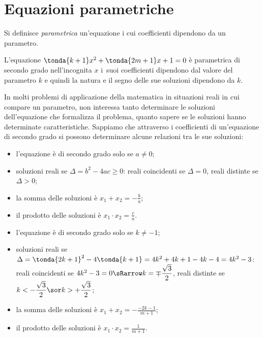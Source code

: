 \section{Equazioni parametriche}
\label{sec:eq2gr_parametriche}

\begin{definizione}
Si definisce \emph{parametrica} un'equazione i cui coefficienti dipendono da un 
parametro.
\end{definizione}
L'equazione \(\tonda{k +1}x^{2} + \tonda{2m +1}x + 1 = 0\) è 
parametrica di secondo 
grado nell'incognita \(x\) i~suoi coefficienti dipendono dal valore del parametro 
\(k\) e quindi la natura e il segno delle sue soluzioni dipendono da \(k\).

In molti problemi di applicazione della matematica in situazioni reali in cui 
compare un parametro, non interessa tanto determinare le soluzioni 
dell'equazione che formalizza il problema, quanto sapere se le soluzioni hanno 
determinate caratteristiche.
Sappiamo che attraverso i coefficienti di un'equazione di secondo grado si 
possono determinare alcune relazioni tra le sue soluzioni:
\begin{itemize} [noitemsep]
\item l'equazione è di secondo grado solo se \(a \neq 0\);
\item soluzioni reali se \(\Delta = b^{2} - 4 a c \geq 0\):
 \subitem reali coincidenti se \(\Delta = 0\), 
 \subitem reali distinte se \(\Delta > 0\);
\item la somma delle soluzioni è \(x_{1} + x_{2} = - \frac{b}{a}\);
\item il prodotto delle soluzioni è \(x_{1} \cdot x_{2} = \frac{c}{a}\).
\end{itemize}

\begin{itemize} [noitemsep]
\item l'equazione è di secondo grado solo se \(k \neq -1\);
\item soluzioni reali se 
\(\Delta = \tonda{2k +1}^{2} - 4 \tonda{k +1}= 4k^2 +4k +1-4k-4= 4k^2-3\):
 \subitem reali coincidenti se 
 \(4k^2-3 = 0 \sRarrow k = \mp \dfrac{\sqrt{3}}{2}\), 
 \subitem reali distinte se 
 \(k < -\dfrac{\sqrt{3}}{2} \sor k > +\dfrac{\sqrt{3}}{2}\);
\item la somma delle soluzioni è 
\(x_{1} + x_{2} = - \frac{-2k -1}{m+1}\);
\item il prodotto delle soluzioni è 
\(x_{1} \cdot x_{2} = \frac{1}{m+1}\).
\end{itemize}

